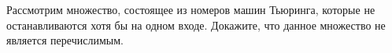 Рассмотрим множество, состоящее из номеров машин Тьюринга, которые не останавливаются хотя бы на одном
входе. Докажите, что данное множество не является перечислимым.
